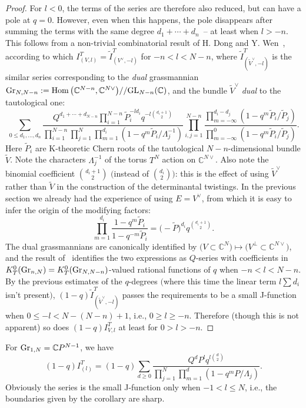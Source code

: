 \documentclass[pdftex]{sigma}
\numberwithin{equation}{section}
\def\CC{\mathbb C}
\def\tilde{\widetilde}
\begin{document}
\begin{proof}
For $l<0$, the terms of the series are therefore also reduced, but can have a pole at $q=0$. However, even when this happens, the pole disappears after summing the terms with the same degree $d_1+\cdots+d_n$~-- at least when $l>-n$. This follows from a non-trivial combinatorial result of H. Dong and Y. Wen~\cite{Dong-Wen}, according to which $I^T_{(V,l)}=\tilde{I}^T_{(V^{\vee},-l)}$ for \mbox{$-n<l<N-n$}, where $\tilde{I}^T_{(\tilde{V}^{\vee},-l)}$ is the similar series corresponding to the {\em dual} grassmannian ${\rm Gr}_{N,N-n}:=\mathop{\rm Hom} \big(\CC^{N-n},\CC^{N\vee}\big)//{\rm GL}_{N-n}(\CC)$, and the bundle $\tilde{V}^{\vee}$ {\em dual} to the tautological one:
\[
\sum_{0\leq d_1,\dots,d_n}\frac{Q^{d_1+\cdots+d_{N-n}}\prod_{i=1}^{N-n}\tilde{P}_i^{-ld_i}q^{-l\binom{d_i+1}{2}}}{\prod_{i=1}^{N-n}\prod_{j=1}^N\prod_{m=1}^{d_i}(1-q^m\tilde{P}_i/\Lambda_j^{-1})} \prod_{i,j=1}^{N-n}\frac{\prod_{m=-\infty}^{d_i-d_j}(1-q^m\tilde{P}_i/\tilde{P}_j)}{\prod_{m=-\infty}^0(1-q^m\tilde{P}_i/\tilde{P}_j)}.
\]
Here $\tilde{P}_i$ are K-theoretic Chern roots of the tautological $N-n$-dimensional bundle $\tilde{V}$. Note the characters $\Lambda_j^{-1}$ of the torus $T^N$ action on $\CC^{N\vee}$. Also note the binomial coefficient $\binom{d_i+1}{2}$ $\big($instead of $\binom{d_i}{2}\big)$: this is the effect of using $\tilde{V}^{\vee}$ rather than $\tilde{V}$ in the construction of the determinantal twistings. In the previous section we already had the experience of using $E=V^{\vee}$, from which it is easy to infer the origin of the modifying factors:
\[
\prod_{m=1}^{d_i}\frac{1-q^m\tilde{P}_i}{1-q^{-m}\tilde{P}_i} = \big({-}\tilde{P}\big)^{d_i}q^{\binom{d_i+1}{2}}.
\]
The dual grassmannians are canonically identified by $\big(V\subset \CC^N\big) \mapsto \big(V^{\perp}\subset \CC^{N\vee}\big)$, and the result of~\cite{Dong-Wen} identifies the two expressions as $Q$-series with coefficients in $K^0_T({\rm Gr}_{n,N})=K^0_T({\rm Gr}_{N,N-n})$-valued rational functions of $q$ when $-n<l<N-n$. By the previous estimates of the $q$-degrees $\big($where this time the linear term $l\sum d_i$ isn't present$\big)$, $(1-q)\tilde{I}^T_{(\tilde{V}^{\vee},-l)}$ passes the requirements to be a small J-function when $0\leq -l < N-(N-n)+1$, i.e., $0\geq l\geq -n$. Therefore (though this is not apparent) so does $(1-q)I^T_{V,l}$ at least for $0>l>-n$.
\end{proof}

\begin{example*}\label{ex1}For ${\rm Gr}_{1,N}=\CC P^{N-1}$, we have
\[
(1-q) I^T_{(l)}=(1-q) \sum_{d\geq 0}\frac{Q^d P^l q^{l\binom{d}{2}}}{\prod_{j=1}^N\prod_{m=1}^d(1-q^mP/\Lambda_j)}.
\]
Obviously the series is the small J-function only when $-1< l \leq N$, i.e., the boundaries given by the corollary are sharp.
\end{example*}
\end{document}
